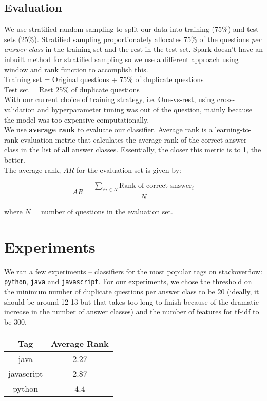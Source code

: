 \documentclass{article}
\begin{document}
\subsection{Evaluation}
We use stratified random sampling to split our data into training (75\%) and test sets (25\%). Stratified sampling proportionately allocates 75\% of the questions \textit{per answer class} in the training set and the rest in the test set. Spark doesn't have an inbuilt method for stratified sampling so we use a different approach using window and rank function to accomplish this.\\

Training set = Original questions + 75\% of duplicate questions\\
Test set = Rest 25\% of duplicate questions\\

With our current choice of training strategy, i.e. One-vs-rest, using cross-validation and hyperparameter tuning was out of the question, mainly because the model was too expensive computationally.\\

We use \textbf{average rank} to evaluate our classifier. Average rank is a learning-to-rank evaluation metric that calculates the average rank of the correct answer class in the list of all answer classes. Essentially, the closer this metric is to 1, the better.\\

The average rank, $AR$ for the evaluation set is given by:

$$AR = \frac{\sum_{\forall i \in N} \text{Rank of correct answer}_i}{N}$$

where $N$ = number of questions in the evaluation set.

\section{Experiments}
We ran a few experiments -- classifiers for the most popular tags  on stackoverflow: \texttt{python}, \texttt{java} and \texttt{javascript}. For our experiments, we chose the threshold on the minimum number of duplicate questions per answer class to be 20 (ideally, it should be around 12-13 but that takes too long to finish because of the dramatic increase in the number of answer classes) and the number of features for tf-idf to be 300.\\

\begin{center}
	\begin{tabular}
		{|c c|} 
		\hline
		Tag & Average Rank\\ 
		\hline\hline
		java & 2.27 \\ 
		\hline
		javascript & 2.87 \\
		\hline
		python & 4.4 \\
		\hline
	\end{tabular}
\end{center}
\end{document}
